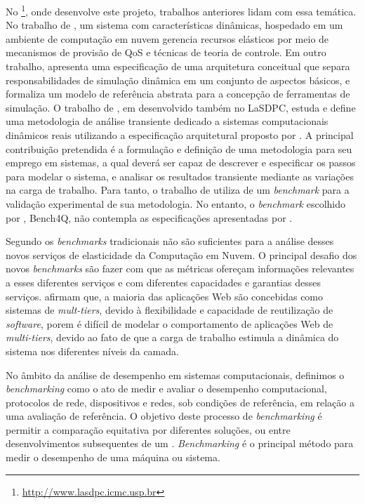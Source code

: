 No \textit{}\footnote{\url{http://www.lasdpc.icmc.usp.br}}, onde desenvolve este projeto, trabalhos anteriores lidam com essa temática. No trabalho de , um sistema com características dinâmicas, hospedado em um ambiente de computação em nuvem gerencia recursos elásticos por meio de mecanismos de provisão de QoS e técnicas de teoria de controle. Em outro trabalho,  apresenta uma especificação de uma arquitetura conceitual que separa responsabilidades de simulação dinâmica em um conjunto de aspectos básicos, e formaliza um modelo de referência abstrata para a concepção de ferramentas de simulação. O trabalho de , em desenvolvido também no LaSDPC, estuda e define uma metodologia de análise transiente dedicado a sistemas computacionais dinâmicos reais utilizando a especificação arquitetural proposto por . A principal contribuição pretendida é a formulação e definição de uma metodologia para seu emprego em sistemas, a qual deverá ser capaz de descrever e especificar os passos para modelar o sistema, e analisar os resultados transiente mediante as variações na carga de trabalho. Para tanto, o trabalho de  utiliza de um \textit{benchmark} para a validação experimental de sua metodologia. No entanto, o \textit{benchmark} escolhido por , Bench4Q, não contempla as especificações apresentadas por .

Segundo  os \textit{benchmarks} tradicionais não são suficientes para a análise desses novos serviços de elasticidade da Computação em Nuvem. O principal desafio dos novos \textit{benchmarks} são fazer com que as métricas ofereçam informações relevantes a esses diferentes serviços e com diferentes capacidades e garantias desses serviços.  afirmam que, a maioria das aplicações Web são concebidas como sistemas de \textit{mult-tiers}, devido à flexibilidade e capacidade de reutilização de \textit{software}, porem é difícil de modelar o comportamento de aplicações Web de \textit{multi-tiers}, devido ao fato de que a carga de trabalho estimula a dinâmica do sistema nos diferentes níveis da camada.

No âmbito da análise de desempenho em sistemas computacionais, definimos o \textit{benchmarking} como o ato de medir e avaliar o desempenho computacional, protocolos de rede, dispositivos e redes, sob condições de referência, em relação a uma avaliação de referência. O objetivo deste processo de \textit{benchmarking} é permitir a comparação equitativa por diferentes soluções, ou entre desenvolvimentos subsequentes de um \textit{}. \textit{Benchmarking} é o principal método para medir o desempenho de uma máquina ou sistema.

